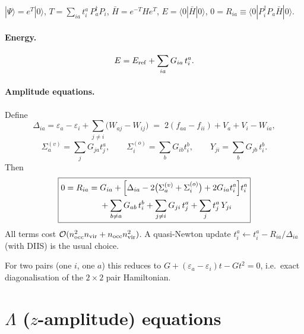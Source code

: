 \documentclass[11pt,a4paper]{article}
\newcommand{\Pd}[1]{P^{\dagger}_{#1}}
\newcommand{\Pa}[1]{P_{#1}}
\begin{document}
$|\Psi\rangle=e^{T}|0\rangle$, $T=\sum_{ia}t^a_i\,\Pd a\Pa i$, $\bar H=e^{-T}He^{T}$,
$E=\langle 0|\bar H|0\rangle$, $0=R_{ia}\equiv\langle 0|\Pd i\Pa a\bar H|0\rangle$.

\paragraph{Energy.}
\begin{equation}
  E=E_{\rm ref}+\sum_{ia}G_{ia}\,t^a_i .
\end{equation}

\paragraph{Amplitude equations.} Define
\begin{equation}
  \Delta_{ia}=\varepsilon_a-\varepsilon_i+\sum_{j\neq i}\bigl(W_{aj}-W_{ij}\bigr)
  \;=\;2(f_{aa}-f_{ii})+V_a+V_i-W_{ia},
  \label{eq:Delta}
\end{equation}
\begin{equation}
  \Sigma^{(v)}_{a}=\sum_j G_{ja}t^a_j,\qquad \Sigma^{(o)}_{i}=\sum_b G_{ib}t^b_i ,\qquad
  Y_{ji}=\sum_b G_{jb}\,t^b_i .
\end{equation}
Then
\begin{equation}
  \boxed{
  \begin{aligned}
  0=R_{ia}=\;& G_{ia}+\Bigl[\Delta_{ia}-2\bigl(\Sigma^{(v)}_a+\Sigma^{(o)}_i\bigr)+2G_{ia}t^a_i\Bigr]t^a_i\\
   &+\sum_{b\neq a}G_{ab}\,t^b_i+\sum_{j\neq i}G_{ji}\,t^a_j+\sum_{j}t^a_j\,Y_{ji}
  \end{aligned}}
  \label{eq:tamp}
\end{equation}
All terms cost $\mathcal O(n_{\rm occ}^2n_{\rm vir}+n_{\rm occ}n_{\rm vir}^2)$.
A quasi-Newton update $t^a_i\leftarrow t^a_i-R_{ia}/\Delta_{ia}$ (with DIIS) is the usual choice.

For two pairs (one $i$, one $a$) this reduces to $G+(\varepsilon_a-\varepsilon_i)t-Gt^2=0$, i.e.\ exact
diagonalisation of the $2\times2$ pair Hamiltonian.

\section{\texorpdfstring{$\Lambda$ ($z$-amplitude) equations}{Lambda (z-amplitude) equations}}
\end{document}
